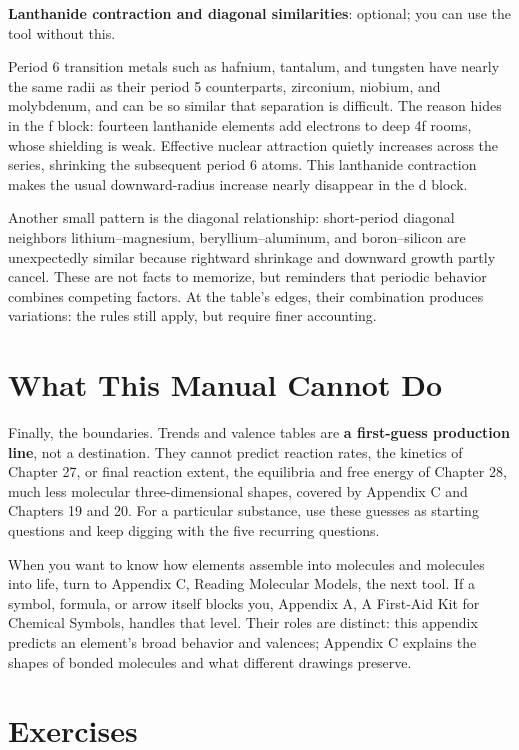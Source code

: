 \begin{tiaozhan}
\textbf{Lanthanide contraction and diagonal similarities}: optional; you can use the tool without this.

Period 6 transition metals such as hafnium, tantalum, and tungsten have nearly the same radii as their period 5 counterparts, zirconium, niobium, and molybdenum, and can be so similar that separation is difficult. The reason hides in the f block: fourteen lanthanide elements add electrons to deep 4f rooms, whose shielding is weak. Effective nuclear attraction quietly increases across the series, shrinking the subsequent period 6 atoms. This lanthanide contraction makes the usual downward-radius increase nearly disappear in the d block.

Another small pattern is the diagonal relationship: short-period diagonal neighbors lithium--magnesium, beryllium--aluminum, and boron--silicon are unexpectedly similar because rightward shrinkage and downward growth partly cancel. These are not facts to memorize, but reminders that periodic behavior combines competing factors. At the table's edges, their combination produces variations: the rules still apply, but require finer accounting.
\end{tiaozhan}

\section{What This Manual Cannot Do}

Finally, the boundaries. Trends and valence tables are \textbf{a first-guess production line}, not a destination. They cannot predict reaction rates, the kinetics of Chapter 27, or final reaction extent, the equilibria and free energy of Chapter 28, much less molecular three-dimensional shapes, covered by Appendix C and Chapters 19 and 20. For a particular substance, use these guesses as starting questions and keep digging with the five recurring questions.

When you want to know how elements assemble into molecules and molecules into life, turn to Appendix C, Reading Molecular Models, the next tool. If a symbol, formula, or arrow itself blocks you, Appendix A, A First-Aid Kit for Chemical Symbols, handles that level. Their roles are distinct: this appendix predicts an element's broad behavior and valences; Appendix C explains the shapes of bonded molecules and what different drawings preserve.

\section*{Exercises}

